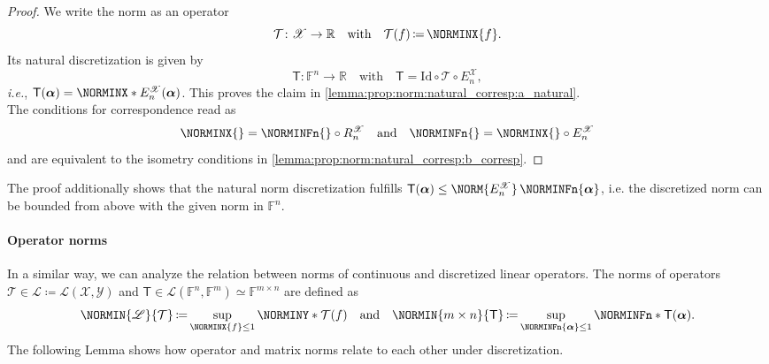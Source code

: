 \documentclass[a4paper]{paper}
\newcommand*{\SPC}[1]{{\ensuremath{\mathscr{#1}}}}
\newcommand*{\SPCL}{\SPC{L}}
\newcommand*{\SPCX}{\SPC{X}}
\newcommand*{\SPCY}{\SPC{Y}}
\newcommand*{\BLINOP}[2]{{\SPCL(#1, #2)}}
\newcommand*{\FIELD}{{\ensuremath{\mathbb{F}}}}
\newcommand*{\Fn}{{\ensuremath{\FIELD^n}}}
\newcommand*{\Fm}{{\ensuremath{\FIELD^m}}}
\newcommand*{\Fmxn}{{\ensuremath{\FIELD^{m \times n}}}}
\newcommand{\RR}{{\ensuremath{\mathbb{R}}}}
\newcommand*{\OP}[1]{{\ensuremath{\mathcal{#1}}}}
\newcommand*{\OPT}{\OP{T}}
\newcommand*{\OPID}{\OP{\mathrm{Id}}}
\newcommand{\DISCOP}[1]{{\ensuremath{\mathsf{#1}}}}
\newcommand*{\DISCOPT}{\DISCOP{T}}
\newcommand*{\EXT}[2]{\ensuremath{E_{#1}^{#2}}}
\newcommand*{\REST}[2]{\ensuremath{R_{#1}^{#2}}}
\newcommand*{\RnX}{{\ensuremath{\REST{n}{\SPC{X}}}}}
\newcommand*{\EnX}{{\ensuremath{\EXT{n}{\SPC{X}}}}}
\DeclareMathOperator{\DEFEQ}{{\coloneqq}}
\newcommand*{\ie}{\textsl{i.e.}\xspace}
\newcommand*{\BDalpha}{\boldsymbol{\alpha}}
\begin{document}
\begin{proof}
 We write the norm as an operator
 \begin{equation*}
  \OPT \colon \SPCX \to \RR \quad \text{with} \quad \OPT(f) \DEFEQ  \NORMINX{f}.
 \end{equation*}
 Its natural discretization is given by
 \begin{equation*}
  \DISCOPT \colon \Fn \to \RR \quad \text{with} \quad \DISCOPT = \OPID \circ \OPT \circ \EnX,
 \end{equation*}
 \ie, $\DISCOPT(\BDalpha) = \NORMINX*{\EnX(\BDalpha)}$. This proves the claim in 
 \eqref{lemma:prop:norm:natural_corresp:a_natural}.\\
 The conditions for correspondence read as
 \begin{equation*}
  \NORMINX{} = \NORMINFn{} \circ \RnX
  \quad \text{and} \quad
  \NORMINFn{} = \NORMINX{} \circ \EnX
 \end{equation*}
 and are equivalent to the isometry conditions in \eqref{lemma:prop:norm:natural_corresp:b_corresp}.
\end{proof}

\begin{remark}
 The proof additionally shows that the natural norm discretization fulfills
 $\DISCOPT(\BDalpha) \leq \NORM{\EnX}\, \NORMINFn{\BDalpha}$, i.e. the discretized norm can be bounded from above 
 with the given norm in $\Fn$.
\end{remark}


\paragraph{Operator norms}

In a similar way, we can analyze the relation between norms of continuous and discretized linear operators. 
The norms of operators $\OPT \in \SPCL \DEFEQ  \BLINOP{\SPCX}{\SPCY}$ and 
$\DISCOPT \in \SPCL(\Fn, \Fm) \simeq \Fmxn$ are defined as
%
\begin{equation*}
 \NORMIN{\SPCL}{\OPT} \DEFEQ  \sup_{\NORMINX{f} \leq 1} \NORMINY*{\OPT(f)}
 \quad \text{and} \quad
 \NORMIN{m\times n}{\DISCOPT} \DEFEQ  \sup_{\NORMINFn{\BDalpha} \leq 1} \NORMINFn*{\DISCOPT(\BDalpha)}.
\end{equation*}
%
The following Lemma shows how operator and matrix norms relate to each other under discretization.
\end{document}
